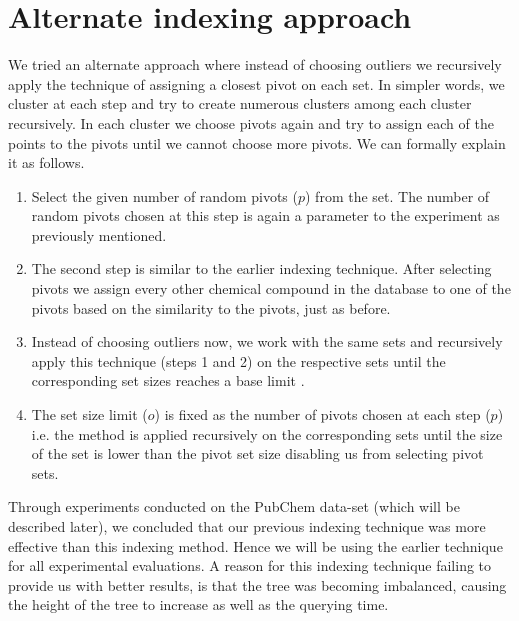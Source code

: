 \section{Alternate indexing approach}

We tried an alternate approach where instead of choosing outliers we recursively apply the technique of assigning a closest pivot on each set. In simpler words, we cluster at each step and try to create numerous clusters among each cluster recursively. In each cluster we choose pivots again and try to assign each of the points to the pivots until we cannot choose more pivots. We can formally explain it as follows.\\


\begin{enumerate}

\item Select the given number of random pivots ($p$) from the set. The number of random pivots chosen at this step is again a parameter to the experiment as previously mentioned.

\item The second step is similar to the earlier indexing technique. After selecting pivots we assign every other chemical compound in the database to one of the pivots based on the similarity to the pivots, just as before.
 
\item Instead of choosing outliers now, we work with the same sets and recursively apply this technique (steps 1 and 2) on the respective sets until the corresponding set sizes reaches a base limit .

\item The set size limit ($o$) is fixed as the number of pivots chosen at each step ($p$) i.e. the method is applied recursively on the corresponding sets until the size of the set is lower than the pivot set size disabling us from selecting pivot sets. \\

\end{enumerate}

Through experiments conducted on the PubChem data-set (which will be described later), we concluded that our previous indexing technique was more effective than this indexing method. Hence we will be using the earlier technique for all experimental evaluations. A reason for this indexing technique failing to provide us with better results, is that the tree was becoming imbalanced, causing the height of the tree to increase as well as the querying time.



